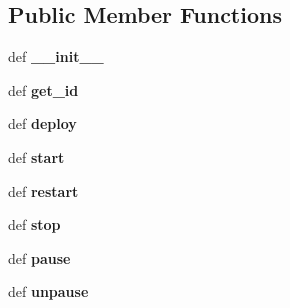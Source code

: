 \subsection*{Public Member Functions}
\begin{DoxyCompactItemize}
\item 
\hypertarget{classhypervisor_1_1docker__driver_1_1Docker_a95faee6439e35695f424c61763b4077e}{def {\bfseries \-\_\-\-\_\-init\-\_\-\-\_\-}}\label{classhypervisor_1_1docker__driver_1_1Docker_a95faee6439e35695f424c61763b4077e}

\item 
\hypertarget{classhypervisor_1_1docker__driver_1_1Docker_aa6d1c57b5e6eb40c234af79445d5ccaa}{def {\bfseries get\-\_\-id}}\label{classhypervisor_1_1docker__driver_1_1Docker_aa6d1c57b5e6eb40c234af79445d5ccaa}

\item 
\hypertarget{classhypervisor_1_1docker__driver_1_1Docker_ab7550e8839169bb0c1ba08050709f1a7}{def {\bfseries deploy}}\label{classhypervisor_1_1docker__driver_1_1Docker_ab7550e8839169bb0c1ba08050709f1a7}

\item 
\hypertarget{classhypervisor_1_1docker__driver_1_1Docker_ae22fe7316ede6ff4986ec8c911602e61}{def {\bfseries start}}\label{classhypervisor_1_1docker__driver_1_1Docker_ae22fe7316ede6ff4986ec8c911602e61}

\item 
\hypertarget{classhypervisor_1_1docker__driver_1_1Docker_a9455c971d4a2824d7ef8b0786b2d754b}{def {\bfseries restart}}\label{classhypervisor_1_1docker__driver_1_1Docker_a9455c971d4a2824d7ef8b0786b2d754b}

\item 
\hypertarget{classhypervisor_1_1docker__driver_1_1Docker_a24338352bbdd29ceda701bae00f256c4}{def {\bfseries stop}}\label{classhypervisor_1_1docker__driver_1_1Docker_a24338352bbdd29ceda701bae00f256c4}

\item 
\hypertarget{classhypervisor_1_1docker__driver_1_1Docker_a59333c78b7994d50b017f43e3a75d60a}{def {\bfseries pause}}\label{classhypervisor_1_1docker__driver_1_1Docker_a59333c78b7994d50b017f43e3a75d60a}

\item 
\hypertarget{classhypervisor_1_1docker__driver_1_1Docker_a6bd4ee04c3dd50a06dd6dac1eb374f9b}{def {\bfseries unpause}}\label{classhypervisor_1_1docker__driver_1_1Docker_a6bd4ee04c3dd50a06dd6dac1eb374f9b}


\end{DoxyCompactItemize}
